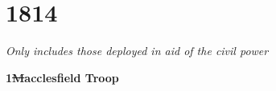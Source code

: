 \chapter*{1814}

\vspace*{10mm}

\begin{center}
  \textit{Only includes those deployed in aid of the civil power}
\end{center}

\vspace*{10mm}

\begin{center}
  \Large
  \textbf{1\st Macclesfield Troop}
\end{center}

\vspace*{10mm}

